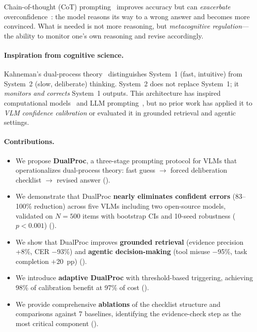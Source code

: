 \documentclass[10pt,twocolumn,letterpaper]{article}
\newcommand{\method}{DualProc}
\newcommand{\sone}{System~1}
\newcommand{\stwo}{System~2}
\begin{document}
Chain-of-thought (CoT) prompting~\cite{wei2022chain,kojima2022large} improves accuracy but can \emph{exacerbate} overconfidence~\cite{xuan2025seeing}: the model reasons its way to a wrong answer and becomes more convinced.
What is needed is not more reasoning, but \emph{metacognitive regulation}---the ability to monitor one's own reasoning and revise accordingly.

\paragraph{Inspiration from cognitive science.}
Kahneman's dual-process theory~\cite{kahneman2011thinking} distinguishes \sone{} (fast, intuitive) from \stwo{} (slow, deliberate) thinking.
\stwo{} does not replace \sone{}; it \emph{monitors and corrects} \sone{} outputs.
This architecture has inspired computational models~\cite{anthony2017thinking,chen2019deep,conwaysmith2022system} and LLM prompting~\cite{kamruzzaman2024prompting,zhang2025leveraging}, but no prior work has applied it to \emph{VLM confidence calibration} or evaluated it in grounded retrieval and agentic settings.

\paragraph{Contributions.}
\begin{itemize}
    \item We propose \textbf{\method{}}, a three-stage prompting protocol for VLMs that operationalizes dual-process theory: fast guess $\to$ forced deliberation checklist $\to$ revised answer ().
    \item We demonstrate that \method{} \textbf{nearly eliminates confident errors} (83--100\% reduction) across five VLMs including two open-source models, validated on $N\!=\!500$ items with bootstrap CIs and 10-seed robustness ($p\!<\!0.001$) ().
    \item We show that \method{} improves \textbf{grounded retrieval} (evidence precision +8\%, CER $-$93\%) and \textbf{agentic decision-making} (tool misuse $-$95\%, task completion $+$20~pp) ().
    \item We introduce \textbf{adaptive \method{}} with threshold-based triggering, achieving 98\% of calibration benefit at 97\% of cost ().
    \item We provide comprehensive \textbf{ablations} of the checklist structure and comparisons against 7 baselines, identifying the evidence-check step as the most critical component ().
\end{itemize}
\end{document}
